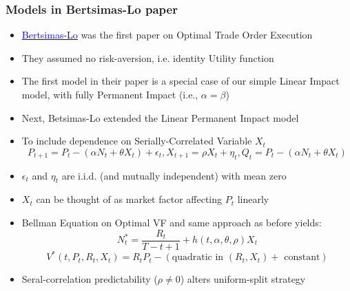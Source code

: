 \documentclass[handout]{beamer}
\begin{document}
\begin{frame}
\frametitle{Models in Bertsimas-Lo paper}
\pause
\begin{itemize}[<+->]
\item \href{http://alo.mit.edu/wp-content/uploads/2015/06/Optimal-Control-of-Execution-Costs.pdf}{\underline{\textcolor{blue}{Bertsimas-Lo}}} was the first paper on Optimal Trade Order Execution
\item They assumed no risk-aversion, i.e. identity Utility function
\item The first model in their paper is a special case of our simple Linear Impact model, with fully Permanent Impact (i.e., $\alpha = \beta$)
\item Next, Betsimas-Lo extended the Linear Permanent Impact model
\item To include dependence on Serially-Correlated Variable $X_t$
$$P_{t+1} = P_t - (\alpha N_t + \theta X_t) + \epsilon_t, X_{t+1} = \rho X_t + \eta_t, Q_t = P_t - (\alpha N_t + \theta X_t)$$
\item $\epsilon_t$ and $\eta_t$ are i.i.d. (and mutually independent) with mean zero
\item $X_t$ can be thought of as market factor affecting $P_t$ linearly
\item Bellman Equation on Optimal VF and same approach as before yields:
$$N^*_t = \frac {R_t} {T-t+1} + h(t, \alpha, \theta, \rho) X_t$$
$$V^*(t,P_t,R_t,X_t) = R_tP_t - (\mbox{quadratic in } (R_t,X_t) + \mbox{ constant})$$
\item Seral-correlation predictability ($\rho \neq 0$) alters uniform-split strategy
\end{itemize}
\end{frame}
\end{document}
